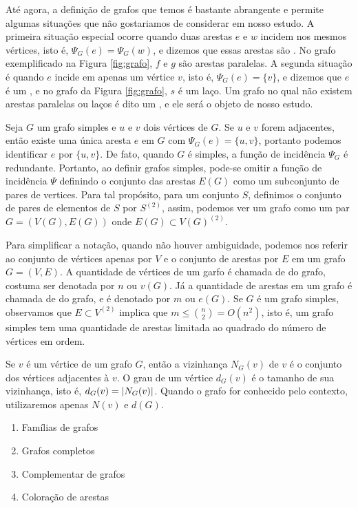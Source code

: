 
Até agora, a definição de grafos que temos é bastante abrangente e permite algumas situações que não gostariamos de considerar em nosso estudo. A primeira situação especial ocorre quando duas arestas $e$ e $w$ incidem nos mesmos vértices, isto é, $\Psi_G(e) = \Psi_G(w)$, e dizemos que essas arestas são . No grafo exemplificado na Figura \ref{fig:grafo}, $f$ e $g$ são arestas paralelas. A segunda situação é quando $e$ incide em apenas um vértice $v$, isto é, $\Psi_G(e) = \{v\}$, e dizemos que $e$ é um , e no grafo da Figura \ref{fig:grafo}, $s$ é um laço. Um grafo no qual não existem arestas paralelas ou laços é dito um , e ele será o objeto de nosso estudo.

Seja $G$ um grafo simples e $u$ e $v$ dois vértices de $G$. Se $u$ e $v$ forem adjacentes, então existe uma única aresta $e$ em $G$ com $\Psi_G(e) = \{u,v\}$, portanto podemos identificar $e$ por $\{u,v\}$. De fato, quando $G$ é simples, a função de incidência $\Psi_G$ é redundante. Portanto, ao definir grafos simples, pode-se omitir a função de incidência $\Psi$ definindo o conjunto das arestas $E(G)$ como um subconjunto de pares de vertices. Para tal propósito, para um conjunto $S$, definimos o conjunto de pares de elementos de $S$ por $S^{(2)}$, assim, podemos ver um grafo como um par $G = (V(G),E(G))$ onde $E(G) \subset V(G)^{(2)}$.

Para simplificar a notação, quando não houver ambiguidade, podemos nos referir ao conjunto de vértices apenas por $V$ e o conjunto de arestas por $E$ em um grafo $G = (V,E)$. A quantidade de vértices de um garfo é chamada de  do grafo, costuma ser denotada por $n$ ou $v(G)$. Já a quantidade de arestas em um grafo é chamada de  do grafo, e é denotado por $m$ ou $e(G)$. Se $G$ é um grafo simples, observamos que $E \subset V^{(2)}$ implica que $m \leq \binom{n}{2} = O(n^2)$, isto é, um grafo simples tem uma quantidade de arestas limitada ao quadrado do número de vértices em ordem.

Se $v$ é um vértice de um grafo $G$, então a vizinhança $N_G(v)$ de $v$ é o conjunto dos vértices adjacentes à $v$. O grau de um vértice $d_G(v)$ é o tamanho de sua vizinhança, isto é, $d_G(v) = \left | N_G(v) \right |$. Quando o grafo for conhecido pelo contexto, utilizaremos apenas $N(v)$ e $d(G)$.

\begin{enumerate}
\item Famílias de grafos
\item Grafos completos
\item Complementar de grafos
\item Coloração de arestas
\end{enumerate}


